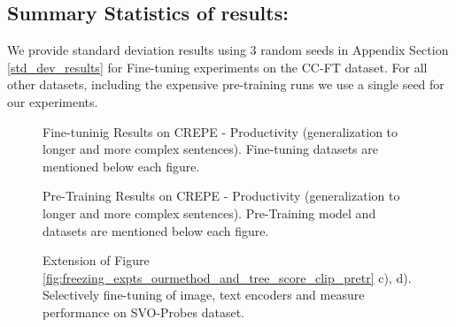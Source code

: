 \documentclass[11pt]{article}
\begin{document}
\begin{table}[h!]
\subsection{Summary Statistics of results:} We provide standard deviation results using 3 random seeds in Appendix Section \ref{std_dev_results} for Fine-tuning experiments on the CC-FT dataset. For all other datasets, including the expensive pre-training runs we use a single seed for our experiments.

\newpage
\begin{figure}[h!]
    \centering
    \hfill
    \caption{Fine-tuninig Results on {\color{blue} CREPE - Productivity} (generalization to longer and more complex sentences). Fine-tuning datasets are mentioned below each figure.}
    \label{fig:Productivity_clip_ft_cc_coo}
\end{figure}

\begin{figure}[h!]
    \centering
    \hfill
    \hfill
    \hfill
    \caption{Pre-Training Results on {\color{blue} CREPE - Productivity} (generalization to longer and more complex sentences). Pre-Training model and datasets are mentioned below each figure.}
    \label{fig:Productivity_clip_pretr}
\end{figure}

\begin{figure}[h!]
    \centering
    \centering
    \caption{Extension of Figure \ref{fig:freezing_expts_ourmethod_and_tree_score_clip_pretr} c), d). Selectively fine-tuning of image, text encoders and measure performance on {\color{blue} SVO-Probes} dataset.}
    \label{fig:freezing_expts__SVO}
\end{figure}


\end{table}
\end{document}

